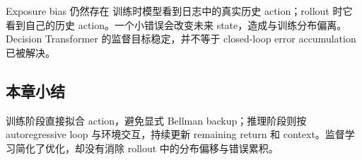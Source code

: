 \begin{warningbox}{Exposure bias 仍然存在}
训练时模型看到日志中的真实历史 action；rollout 时它看到自己的历史 action。一个小错误会改变未来 state，造成与训练分布偏离。Decision Transformer 的监督目标稳定，并不等于 closed-loop error accumulation 已被解决。
\end{warningbox}

\subsection{本章小结}

训练阶段直接拟合 action，避免显式 Bellman backup；推理阶段则按 autoregressive loop 与环境交互，持续更新 remaining return 和 context。监督学习简化了优化，却没有消除 rollout 中的分布偏移与错误累积。

